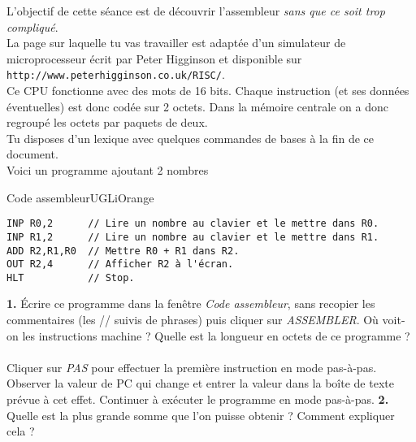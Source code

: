 \documentclass[11pt,a4paper,eval,firamath]{nsi}
\begin{document}
\maketitle

L'objectif de cette séance est de découvrir l'assembleur \textit{sans que ce soit trop compliqué}.\\

La page sur laquelle tu vas travailler est adaptée d'un simulateur de microprocesseur écrit par Peter Higginson et disponible sur \texttt{http://www.peterhigginson.co.uk/RISC/}.\\

Ce CPU fonctionne avec des mots de 16 bits. Chaque instruction (et ses données éventuelles) est donc codée sur 2 octets. Dans la mémoire centrale on a donc regroupé les octets par paquets de deux.\\

Tu disposes d'un lexique avec quelques commandes de bases à la fin de ce document.\\

Voici un programme ajoutant 2 nombres
\begin{encadrecolore}{Code assembleur}{UGLiOrange}
\begin{verbatim}
INP R0,2      // Lire un nombre au clavier et le mettre dans R0.
INP R1,2      // Lire un nombre au clavier et le mettre dans R1.
ADD R2,R1,R0  // Mettre R0 + R1 dans R2.
OUT R2,4      // Afficher R2 à l'écran.
HLT           // Stop.
\end{verbatim}
\end{encadrecolore}



\textbf{1.}	\'Ecrire ce programme dans la fenêtre \textit{Code assembleur}, sans recopier les commentaires (les // suivis de phrases) puis cliquer sur \textit{ASSEMBLER}. Où voit-on les instructions machine ? Quelle est la longueur en octets de ce programme ?\\

\\

Cliquer sur \textit{PAS} pour effectuer la première instruction en mode pas-à-pas. Observer la valeur de PC qui change et entrer la valeur dans la boîte de texte prévue à cet effet.
Continuer à exécuter le programme en mode pas-à-pas.
\newpage 
\textbf{2.} Quelle est la plus grande somme que l'on puisse obtenir ? Comment
expliquer cela ?\\
\end{document}
